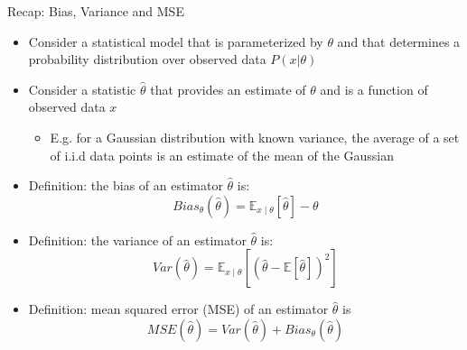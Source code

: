 \begin{frame}[c]{Recap: Bias, Variance and MSE}

\begin{itemize}
	\item Consider a statistical model that is parameterized by $\theta$ and that determines
	a probability distribution over observed data $P(x|\theta)$
	\item Consider a statistic $\hat{\theta}$ that provides an estimate of $\theta$ and is a function of
	observed data $x$
	\begin{itemize}
		\item E.g. for a Gaussian distribution with known variance, the average of a set of
		i.i.d data points is an estimate of the mean of the Gaussian
	\end{itemize}
	\item Definition: the bias of an estimator $\hat{\theta}$ is:
	$$ Bias_{\theta} (\hat{\theta}) = \mathbb{E}_{x\mid \theta} [\hat{\theta}] - \theta$$
	\item Definition: the variance of an estimator $\hat{\theta}$ is:
	$$ Var (\hat{\theta}) = \mathbb{E}_{x\mid \theta} [(\hat{\theta} - \mathbb{E}[\hat{\theta}])^2] $$
	\item Definition: mean squared error (MSE) of an estimator $\hat{\theta}$ is
	$$MSE(\hat{\theta}) = Var(\hat{\theta})  + Bias_{\theta} (\hat{\theta}) $$
\end{itemize}

\end{frame}
